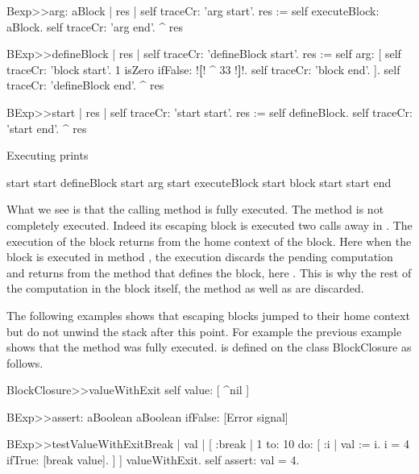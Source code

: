 \documentclass[a4paper,10pt,twoside]{book}
\begin{document}
\begin{code}{}
Bexp>>arg: aBlock
	| res |
	self traceCr: 'arg start'. 
	res := self executeBlock: aBlock.
	self traceCr: 'arg end'. 
	^ res 
\end{code}

\begin{code}{}
BExp>>defineBlock
	| res |
	self traceCr: 'defineBlock start'.
	res := self arg: [ self traceCr: 'block start'. 
                            1 isZero ifFalse: !\textbf{[}! ^ 33 !\textbf{]}!.
                            self traceCr: 'block end'. ].
	self traceCr: 'defineBlock end'.
	^ res
\end{code}


\begin{code}{}
BExp>>start
	| res |
	self traceCr: 'start start'.
	res := self defineBlock.
	self traceCr: 'start end'.
	^ res
\end{code}

Executing   prints

\begin{code}{}
start start
defineBlock start
arg start
executeBlock start
block start
start end
\end{code}

What we see is that the calling method  is fully executed. The method  is not completely executed. Indeed its escaping block \ct{[^33]} is executed two calls away in . The execution of the block  returns from the home context of the block. Here when the block is executed in method , the execution discards the pending computation and returns from the method that defines the block, here . This is why 
the rest of the computation in the block itself, the  method as well as  are discarded. 



The following examples shows that escaping blocks jumped to their home context but do not unwind the stack after this point. For example the previous example shows that the method  was fully executed. 
 is defined on the class BlockClosure as follows.

\begin{code}{}
BlockClosure>>valueWithExit 
	  self value: [ ^nil ]
\end{code}

\begin{code}{}
BExp>>assert: aBoolean
	aBoolean ifFalse: [Error signal]

BExp>>testValueWithExitBreak
	| val |
	[ :break |
	    1 to: 10 do: [ :i |
			val := i.
			i = 4 ifTrue: [break value].
		] 
	] valueWithExit.
	self assert: val = 4.
\end{code}
\end{document}
